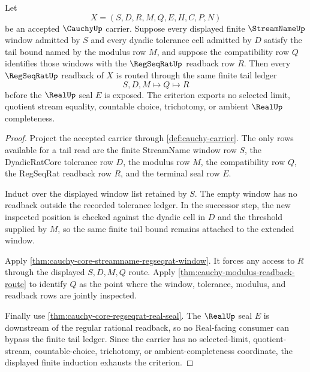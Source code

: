 \begin{theorem}
\label{thm:cauchy-core-finite-tail-criterion}
Let
$$
X=(S,D,R,M,Q,E,H,C,P,N)
$$
be an accepted $\CauchyUp$ carrier. Suppose every displayed finite $\StreamNameUp$ window admitted by $S$ and every dyadic tolerance cell admitted by $D$ satisfy the tail bound named by the modulus row $M$, and suppose the compatibility row $Q$ identifies those windows with the $\RegSeqRatUp$ readback row $R$. Then every $\RegSeqRatUp$ readback of $X$ is routed through the same finite tail ledger
$$
S,D,M \longmapsto Q \longmapsto R
$$
before the $\RealUp$ seal $E$ is exposed. The criterion exports no selected limit, quotient stream equality, countable choice, trichotomy, or ambient $\RealUp$ completeness.
\end{theorem}
\begin{proof}
Project the accepted carrier through \autoref{def:cauchy-carrier}. The only rows available for a tail read are the finite StreamName window row $S$, the DyadicRatCore tolerance row $D$, the modulus row $M$, the compatibility row $Q$, the RegSeqRat readback row $R$, and the terminal seal row $E$.

Induct over the displayed window list retained by $S$. The empty window has no readback outside the recorded tolerance ledger. In the successor step, the new inspected position is checked against the dyadic cell in $D$ and the threshold supplied by $M$, so the same finite tail bound remains attached to the extended window.

Apply \autoref{thm:cauchy-core-streamname-regseqrat-window}. It forces any access to $R$ through the displayed $S,D,M,Q$ route. Apply \autoref{thm:cauchy-modulus-readback-route} to identify $Q$ as the point where the window, tolerance, modulus, and readback rows are jointly inspected.

Finally use \autoref{thm:cauchy-core-regseqrat-real-seal}. The $\RealUp$ seal $E$ is downstream of the regular rational readback, so no Real-facing consumer can bypass the finite tail ledger. Since the carrier has no selected-limit, quotient-stream, countable-choice, trichotomy, or ambient-completeness coordinate, the displayed finite induction exhausts the criterion.
\end{proof}

